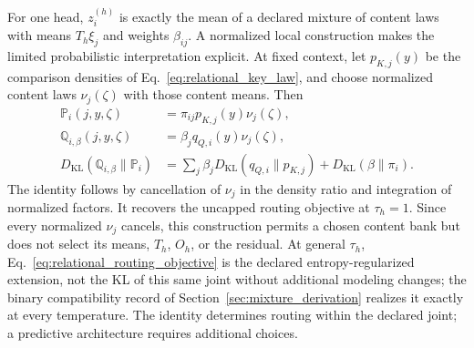\documentclass[twoside,11pt]{article}
\begin{document}
For one head, $z_i^{(h)}$ is exactly the mean of a declared mixture of content laws with means $T_h\xi_j$ and weights $\beta_{ij}$. A normalized local construction makes the limited probabilistic interpretation explicit. At fixed context, let $p_{K,j}(y)$ be the comparison densities of Eq.~\eqref{eq:relational_key_law}, and choose normalized content laws $\nu_j(\zeta)$ with those content means. Then
\begin{align}
\mathbb P_i(j,y,\zeta)&=\pi_{ij}p_{K,j}(y)\nu_j(\zeta),\\
\mathbb Q_{i,\beta}(j,y,\zeta)&=\beta_jq_{Q,i}(y)\nu_j(\zeta),\\
D_{\mathrm{KL}}(\mathbb Q_{i,\beta}\|\mathbb P_i)
&=\sum_j\beta_jD_{\mathrm{KL}}(q_{Q,i}\|p_{K,j})
+D_{\mathrm{KL}}(\beta\|\pi_i).
\label{eq:relational_normalized_model}
\end{align}
The identity follows by cancellation of $\nu_j$ in the density ratio and integration of normalized factors. It recovers the uncapped routing objective at $\tau_h=1$. Since every normalized $\nu_j$ cancels, this construction permits a chosen content bank but does not select its means, $T_h$, $O_h$, or the residual. At general $\tau_h$, Eq.~\eqref{eq:relational_routing_objective} is the declared entropy-regularized extension, not the KL of this same joint without additional modeling changes; the binary compatibility record of Section~\ref{sec:mixture_derivation} realizes it exactly at every temperature. The identity determines routing within the declared joint; a predictive architecture requires additional choices.
\end{document}
